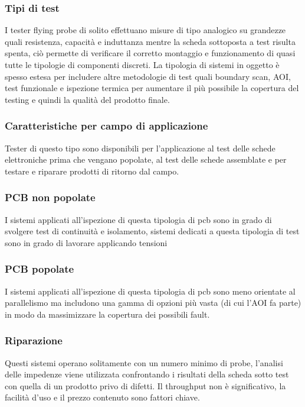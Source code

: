 \subsubsection{Tipi di test}

I tester flying probe di solito effettuano misure di tipo analogico su grandezze quali resistenza, capacità e induttanza mentre la scheda sottoposta a test risulta spenta, ciò permette di verificare il corretto 
montaggio e funzionamento di quasi tutte le tipologie di componenti discreti.  
La tipologia di sistemi in oggetto è spesso estesa per includere altre metodologie di test quali boundary 
scan, AOI, test funzionale e ispezione termica per aumentare il più possibile la copertura del testing e 
quindi la qualità del prodotto finale. 

\subsubsection{Caratteristiche per campo di applicazione}
Tester di questo tipo sono disponibili per l’applicazione al test delle schede elettroniche prima che 
vengano popolate, al test delle schede assemblate e per testare e riparare prodotti di ritorno dal campo. 

\subsubsection{PCB non popolate}
I sistemi applicati all’ispezione di questa tipologia di pcb sono in grado di svolgere test di continuità e 
isolamento, sistemi dedicati a questa tipologia di test sono in grado di lavorare applicando tensioni 

\subsubsection{PCB popolate}
I sistemi applicati all’ispezione di questa tipologia di pcb sono meno orientate al parallelismo ma
includono una gamma di opzioni più vasta (di cui l’AOI fa parte) in modo da massimizzare la copertura dei
possibili fault.

\subsubsection{Riparazione}
Questi sistemi operano solitamente con un numero minimo di probe, l’analisi delle impedenze viene
utilizzata confrontando i risultati della scheda sotto test con quella di un prodotto privo di difetti. Il
throughput non è significativo, la facilità d’uso e il prezzo contenuto sono fattori chiave.

